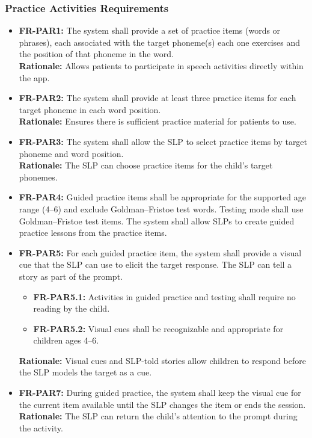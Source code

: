 \documentclass[12pt]{article}
\begin{document}
\subsubsection{Practice Activities Requirements}
\begin {itemize}
\item \textbf{FR-PAR1:} The system shall provide a set of practice items (words or phrases), each associated with the target phoneme(s) each one exercises and the position of that phoneme in the word. \\
\textbf{Rationale:} Allows patients to participate in speech activities directly within the app.
\item \textbf{FR-PAR2:} The system shall provide at least three practice items for each target phoneme in each word position. \\
\textbf{Rationale:} Ensures there is sufficient practice material for patients to use. 
\item \textbf{FR-PAR3:} The system shall allow the SLP to select practice items by target phoneme and word position. \\
\textbf{Rationale:} The SLP can choose practice items for the child's target phonemes.
\item \textbf{FR-PAR4:} Guided practice items shall be appropriate for the supported age range (4--6) and exclude Goldman--Fristoe test words. Testing mode shall use Goldman--Fristoe test items. The system shall allow SLPs to create guided practice lessons from the practice items.
\item \textbf{FR-PAR5:} For each guided practice item, the system shall provide a visual cue that the SLP can use to elicit the target response. The SLP can tell a story as part of the prompt.
\begin {itemize}
  \item \textbf{FR-PAR5.1:} Activities in guided practice and testing shall require no reading by the child.
  \item \textbf{FR-PAR5.2:} Visual cues shall be recognizable and appropriate for children ages 4--6.
\end{itemize}
\textbf{Rationale:} Visual cues and SLP-told stories allow children to respond before the SLP models the target as a cue.
\item \textbf{FR-PAR7:} During guided practice, the system shall keep the visual cue for the current item available until the SLP changes the item or ends the session. \\
\textbf{Rationale:} The SLP can return the child's attention to the prompt during the activity.
\end{itemize}
\end{document}
